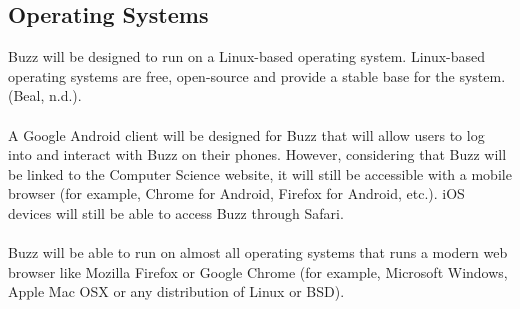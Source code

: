 \documentclass[a4paper,12pt]{report}
\begin{document}
		\subsection{Operating Systems}
			Buzz will be designed to run on a Linux-based operating system. Linux-based operating systems are free, open-source and provide a stable base for the system. (Beal, n.d.).\\
			\\
			A Google Android client will be designed for Buzz that will allow users to log into and interact with Buzz on their phones. However, considering that Buzz will be linked to the Computer Science website, it will still be accessible with a mobile browser (for example, Chrome for Android, Firefox for Android, etc.). iOS devices will still be able to access Buzz through Safari.\\
			\\
			Buzz will be able to run on almost all operating systems that runs a modern web browser like Mozilla Firefox or Google Chrome (for example, Microsoft Windows, Apple Mac OSX or any distribution of Linux or BSD).
\end{document}
